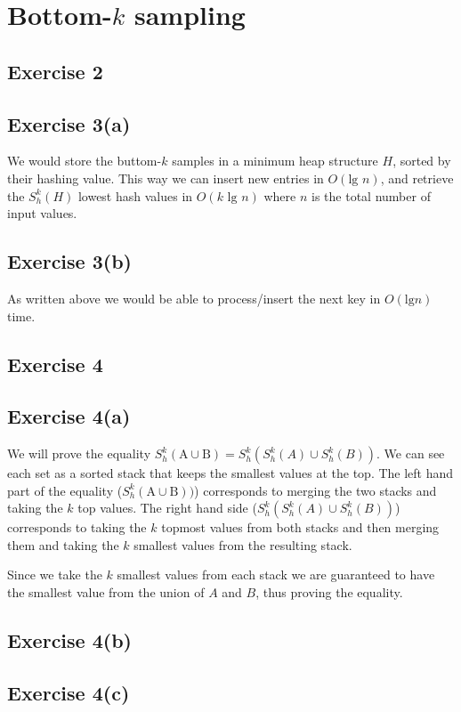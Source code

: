 \section{Bottom-$k$ sampling}

\subsection{Exercise 2}

\subsection{Exercise 3(a)}
We would store the buttom-$k$ samples in a minimum heap structure $H$, sorted by
their hashing value. This way we can insert new entries in $O(\text{lg } n)$,
and retrieve the $S^{k}_{h}(H)$ lowest hash values in $O(k \text{ lg } n)$ where
$n$ is the total number of input values.

\subsection{Exercise 3(b)}
As written above we would be able to process/insert the next key in $O(\text{lg
} n)$ time.


\subsection{Exercise 4}
\subsection{Exercise 4(a)}
We will prove the equality $S^{k}_{h}(\text{A} \cup \text{B}) =
S^{k}_{h}(S^{k}_{h}(A) \cup S^{k}_{h}(B))$.
%
We can see each set as a sorted stack that keeps the smallest values at the
top. The left hand part of the equality ($S^{k}_{h}(\text{A} \cup \text{B}))$)
corresponds to merging the two stacks and taking the $k$ top values.
%
The right hand side ($S^{k}_{h}(S^{k}_{h}(A) \cup S^{k}_{h}(B))$) corresponds to
taking the $k$ topmost values from both stacks and then merging them and taking
the $k$ smallest values from the resulting stack.

Since we take the $k$ smallest values from each stack we are guaranteed to have
the smallest value from the union of $A$ and $B$, thus proving the equality.

\subsection{Exercise 4(b)}


\subsection{Exercise 4(c)}